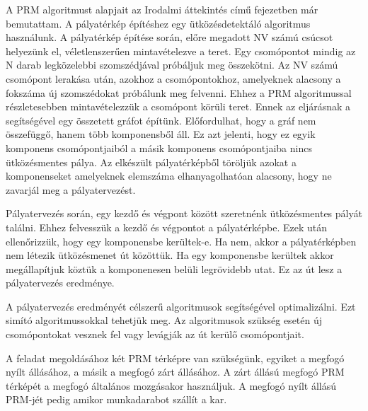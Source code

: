 A PRM algoritmust alapjait az Irodalmi áttekintés című fejezetben már bemutattam. A pályatérkép építéshez egy ütközésdetektáló algoritmus használunk. A pályatérkép építése során, előre megadott NV számú csúcsot helyezünk el,  véletlenszerűen mintavételezve a teret. Egy csomópontot mindig az N darab legközelebbi szomszédjával próbáljuk meg összekötni. Az NV számú csomópont lerakása után, azokhoz a csomópontokhoz, amelyeknek alacsony a fokszáma új szomszédokat próbálunk meg felvenni. Ehhez a PRM algoritmussal részletesebben mintavételezzük a csomópont körüli teret. Ennek az eljárásnak a segítségével egy összetett gráfot építünk. Előfordulhat, hogy a gráf nem összefüggő, hanem több komponensből áll. Ez azt jelenti, hogy ez egyik komponens csomópontjaiból a másik komponens csomópontjaiba nincs ütközésmentes pálya. Az elkészült pályatérképből töröljük azokat a komponenseket amelyeknek elemszáma elhanyagolhatóan alacsony, hogy ne zavarjál meg a pályatervezést.

Pályatervezés során, egy kezdő és végpont között szeretnénk ütközésmentes pályát találni. Ehhez felvesszük a kezdő és végpontot a pályatérképbe. Ezek után ellenőrizzük, hogy egy komponensbe kerültek-e. Ha nem, akkor a pályatérképben nem létezik ütközésmenet út közöttük. Ha egy komponensbe kerültek akkor megállapítjuk köztük a komponenesen belüli legrövidebb utat. Ez az út lesz a pályatervezés eredménye.

A pályatervezés eredményét célszerű algoritmusok segítségével optimalizálni. Ezt simító algoritmussokkal tehetjük meg. Az algoritmusok szükség esetén új csomópontokat vesznek fel vagy levágják az út kerülő csomópontjait.

A feladat megoldásához két PRM térképre van szükségünk, egyiket a megfogó nyílt állásához, a másik a megfogó zárt állásához. A zárt állású megfogó PRM térképét a megfogó általános mozgásakor használjuk. A megfogó nyílt állású PRM-jét pedig amikor munkadarabot szállít a kar.

